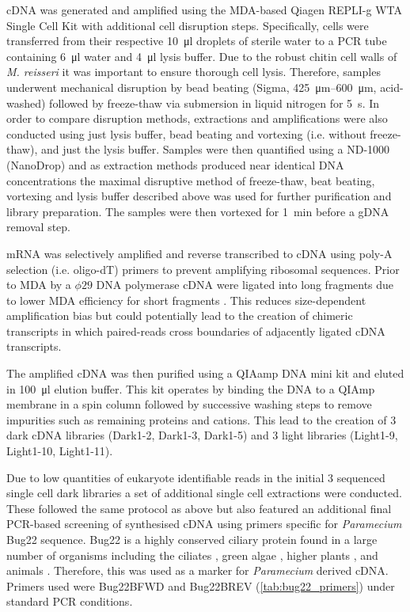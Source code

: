 cDNA was generated and amplified using the MDA-based Qiagen REPLI-g WTA Single Cell Kit \citep{Korfhage2015}
with additional cell disruption steps. 
Specifically, cells were transferred from their respective \SI{10}{\micro\litre} droplets of sterile water to
a PCR tube containing \SI{6}{\micro\litre} water and \SI{4}{\micro\litre} lysis buffer. 
Due to the robust chitin cell walls of \textit{M. reisseri} \citep{Kapaun1995} it was important to
ensure thorough cell lysis. Therefore, samples underwent mechanical disruption by bead beating (Sigma, \SIrange{425}{600}{\micro\metre}, 
acid-washed) followed by freeze-thaw via submersion in liquid nitrogen for \SI{5}{\second}.
In order to compare disruption methods, extractions and amplifications
were also conducted using just lysis buffer, bead beating and vortexing (i.e. without freeze-thaw), 
and just the lysis buffer.  Samples were then quantified using a ND-1000 (NanoDrop)
and as extraction methods produced near identical DNA concentrations 
the maximal disruptive method of freeze-thaw, beat beating, vortexing and lysis buffer
described above was used for further purification and library preparation.
The samples were then vortexed for \SI{1}{\minute} before a gDNA removal step.

mRNA was selectively amplified and reverse transcribed to cDNA using poly-A selection (i.e. oligo-dT) primers
to prevent amplifying ribosomal sequences. Prior to MDA by a \(\phi29\) DNA polymerase
cDNA were ligated into long fragments due to lower MDA efficiency for short fragments \citep{Korfhage2015}.
This reduces size-dependent amplification bias but could potentially lead to the creation
of chimeric transcripts in which paired-reads cross boundaries of adjacently ligated
cDNA transcripts.  

The amplified cDNA was then purified using a QIAamp DNA mini kit and eluted in \SI{100}{\micro\litre} elution buffer.
This kit operates by binding the DNA to a QIAmp membrane in a spin column followed by successive washing steps
to remove impurities such as remaining proteins and cations. This lead to the creation of 3 dark cDNA 
libraries (Dark1-2, Dark1-3, Dark1-5) and 3 light libraries (Light1-9, Light1-10, Light1-11).


Due to low quantities of eukaryote identifiable reads in the initial 3 sequenced single cell
dark libraries a set of additional single cell extractions were conducted. 
These followed the same protocol as above but also featured an additional
final PCR-based screening of synthesised cDNA using primers specific for \textit{Paramecium}
Bug22 sequence. Bug22 is a highly conserved ciliary protein found in a large number of organisms
including the ciliates \citep{Smith2005,Laligne2010}, green algae \citep{Keller2005,Laligne2010,Meng2014}, higher plants \citep{Hodges2011}, and animals \citep{MendesMaia2014}.
Therefore, this was used as a marker for \textit{Paramecium} derived cDNA.
Primers used were Bug22BFWD and Bug22BREV (\cref{tab:bug22_primers}) under standard PCR conditions.  

